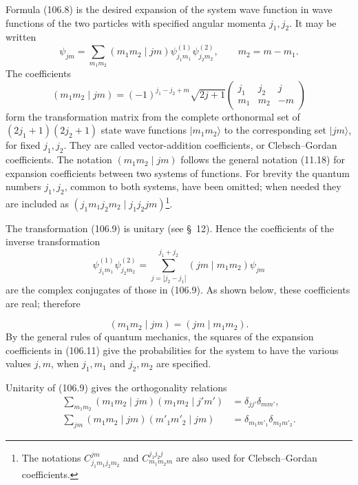 Formula (106.8) is the desired expansion of the system wave function in wave functions of the two particles with specified angular momenta $j_1,j_2$. It may be written
\begin{equation}
 \psi_{jm}=\sum_{m_1m_2}(m_1m_2\mid jm)\psi^{(1)}_{j_1m_1}\psi^{(2)}_{j_2m_2},\qquad m_2=m-m_1.
 \tag{106.9}
\end{equation}
The coefficients
\begin{equation}
 (m_1m_2\mid jm)=(-1)^{j_1-j_2+m}\sqrt{2j+1}
 \begin{pmatrix}j_1&j_2&j\\m_1&m_2&-m\end{pmatrix}
 \tag{106.10}
\end{equation}
form the transformation matrix from the complete orthonormal set of $(2j_1+1)(2j_2+1)$ state wave functions $|m_1m_2\rangle$ to the corresponding set $|jm\rangle$, for fixed $j_1,j_2$. They are called vector-addition coefficients, or Clebsch--Gordan coefficients. The notation $(m_1m_2\mid jm)$ follows the general notation (11.18) for expansion coefficients between two systems of functions. For brevity the quantum numbers $j_1,j_2$, common to both systems, have been omitted; when needed they are included as $(j_1m_1j_2m_2\mid j_1j_2jm)$\footnote{The notations $C^{jm}_{j_1m_1j_2m_2}$ and $C^{j_1j_2j}_{m_1m_2m}$ are also used for Clebsch--Gordan coefficients.}.

The transformation (106.9) is unitary (see \S~12). Hence the coefficients of the inverse transformation
\begin{equation}
 \psi^{(1)}_{j_1m_1}\psi^{(2)}_{j_2m_2}
 =\sum_{j=|j_2-j_1|}^{j_1+j_2}(jm\mid m_1m_2)\psi_{jm}
 \tag{106.11}
\end{equation}
are the complex conjugates of those in (106.9). As shown below, these coefficients are real; therefore

\[
 (m_1m_2\mid jm)=(jm\mid m_1m_2).
\]
By the general rules of quantum mechanics, the squares of the expansion coefficients in (106.11) give the probabilities for the system to have the various values $j,m$, when $j_1,m_1$ and $j_2,m_2$ are specified.

Unitarity of (106.9) gives the orthogonality relations
\begin{align}
 \sum_{m_1m_2}(m_1m_2\mid jm)(m_1m_2\mid j'm')&=\delta_{jj'}\delta_{mm'}, \tag{106.12}\\
 \sum_{jm}(m_1m_2\mid jm)(m'_1m'_2\mid jm)&=\delta_{m_1m'_1}\delta_{m_2m'_2}. \tag{106.13}
\end{align}

